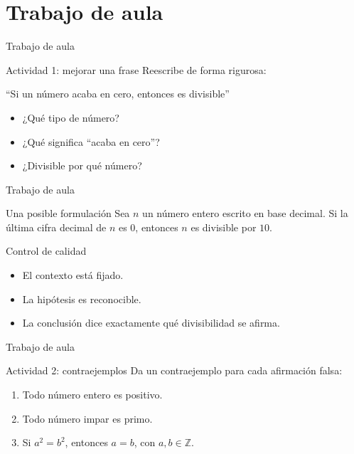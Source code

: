 \documentclass[aspectratio=169,11pt]{beamer}
\newcommand{\Z}{\mathbb{Z}}
\begin{document}
\section{Trabajo de aula}

\begin{frame}{Trabajo de aula}
\begin{block}{Actividad 1: mejorar una frase}
Reescribe de forma rigurosa:
\begin{center}
  \Large ``Si un número acaba en cero, entonces es divisible''
\end{center}
\end{block}

\begin{itemize}
  \item ¿Qué tipo de número?
  \item ¿Qué significa ``acaba en cero''?
  \item ¿Divisible por qué número?
\end{itemize}
\end{frame}

\begin{frame}{Trabajo de aula}
\begin{block}{Una posible formulación}
Sea \(n\) un número entero escrito en base decimal. Si la última cifra decimal
de \(n\) es \(0\), entonces \(n\) es divisible por \(10\).
\end{block}

\begin{block}{Control de calidad}
\begin{itemize}
  \item El contexto está fijado.
  \item La hipótesis es reconocible.
  \item La conclusión dice exactamente qué divisibilidad se afirma.
\end{itemize}
\end{block}
\end{frame}

\begin{frame}{Trabajo de aula}
\begin{block}{Actividad 2: contraejemplos}
Da un contraejemplo para cada afirmación falsa:
\begin{enumerate}
  \item Todo número entero es positivo.
  \item Todo número impar es primo.
  \item Si \(a^2=b^2\), entonces \(a=b\), con \(a,b\in\Z\).
\end{enumerate}
\end{block}
\end{frame}
\end{document}
